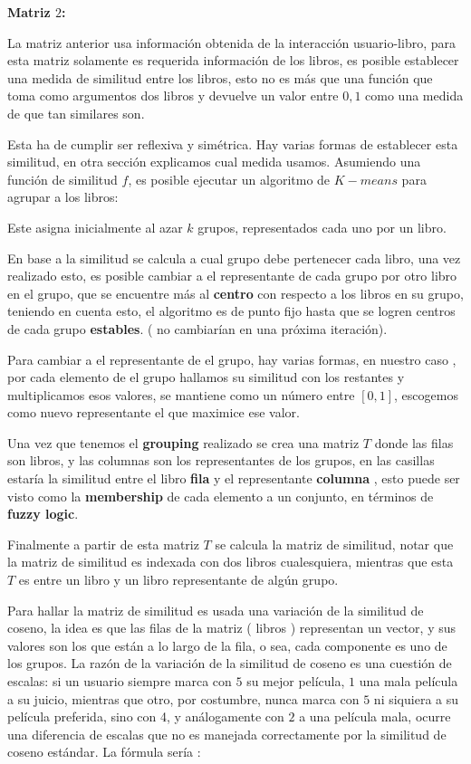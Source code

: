 \documentclass[14pt]{extarticle}
\begin{document}
\textbf{Matriz $2$:}

La matriz anterior usa información obtenida de la interacción usuario-libro, para esta matriz solamente es requerida información de los libros, es posible establecer una medida de similitud entre los libros, esto no es más que una función que toma como argumentos dos libros y devuelve un valor entre $0, 1$ como una medida de que tan similares son. 

Esta ha de cumplir ser reflexiva y simétrica. Hay varias formas de establecer esta similitud, en otra sección explicamos cual medida usamos. Asumiendo una función de similitud $f$, es posible ejecutar un algoritmo de $K-means$ para agrupar a los libros:

Este asigna inicialmente al azar $k$ grupos, representados cada uno por un libro.

En base a la similitud se calcula a cual grupo debe pertenecer cada libro, una vez realizado esto, es posible cambiar a el representante de cada grupo por otro libro en el grupo, que se encuentre más al \textbf{centro} con respecto a los libros en su grupo, teniendo en cuenta esto, el algoritmo es de punto fijo hasta que se logren centros de cada grupo \textbf{estables}. ( no cambiarían en una próxima iteración). 

Para cambiar a el representante de el grupo,  hay varias formas, en nuestro caso , por cada elemento de el grupo  hallamos su similitud con los restantes y multiplicamos esos valores, se mantiene como un número entre $[0, 1]$, escogemos como nuevo representante el que maximice ese valor.

Una vez que tenemos el \textbf{grouping} realizado se crea una matriz $T$ donde las filas son libros, y las columnas son los representantes de los grupos, en las casillas estaría la similitud entre el libro \textbf{fila} y el representante \textbf{columna} , esto puede ser visto como la \textbf{membership} de cada elemento a un conjunto, en términos de \textbf{fuzzy logic}.

Finalmente a partir de esta matriz $T$ se calcula la matriz de similitud, notar que la matriz de similitud es indexada con dos libros cualesquiera, mientras que esta $T$ es entre un libro y un libro representante de algún grupo.

Para hallar la matriz de similitud es usada una variación de la similitud de coseno, la idea es que las filas de la matriz ( libros ) representan un vector, y sus valores son los que están a lo largo de la fila, o sea, cada componente es uno de los grupos. La razón de la variación de la similitud de coseno es una cuestión de escalas: si un usuario siempre marca con $5$ su mejor película, $1$ una mala película a su juicio, mientras que otro, por costumbre, nunca marca con $5$ ni siquiera a su película preferida, sino con 4, y análogamente con $2$ a una película mala, ocurre una diferencia de escalas que no es manejada correctamente por la similitud de coseno estándar. La fórmula sería : 
\end{document}
